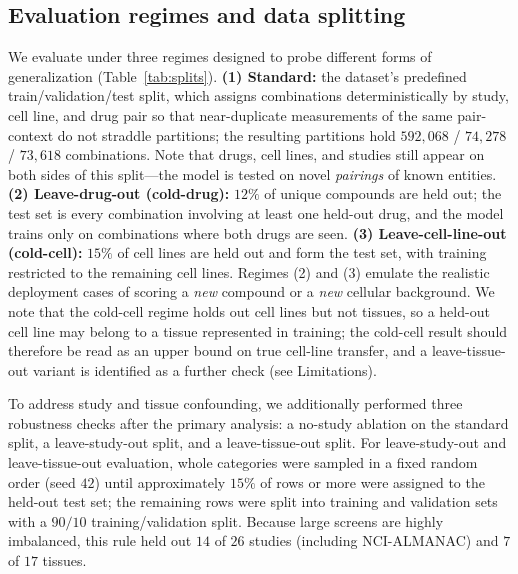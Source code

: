 \documentclass{bmcart}
\begin{document}
\subsection*{Evaluation regimes and data splitting}
We evaluate under three regimes designed to probe different forms of generalization
(Table~\ref{tab:splits}). \textbf{(1) Standard:} the dataset's predefined train/validation/test split,
which assigns combinations deterministically by study, cell line, and drug pair so that near-duplicate
measurements of the same pair-context do not straddle partitions; the resulting partitions hold
$592{,}068$ / $74{,}278$ / $73{,}618$ combinations. Note that drugs, cell lines, and studies still
appear on both sides of this split---the model is tested on novel \emph{pairings} of known entities.
\textbf{(2) Leave-drug-out (cold-drug):} $12\%$ of unique compounds are held out; the test set is every
combination involving at least one held-out drug, and the model trains only on combinations where both
drugs are seen. \textbf{(3) Leave-cell-line-out (cold-cell):} $15\%$ of cell lines are held out and form
the test set, with training restricted to the remaining cell lines. Regimes (2) and (3) emulate the
realistic deployment cases of scoring a \emph{new} compound or a \emph{new} cellular background. We
note that the cold-cell regime holds out cell lines but not tissues, so a held-out cell line may belong
to a tissue represented in training; the cold-cell result should therefore be read as an upper bound on
true cell-line transfer, and a leave-tissue-out variant is identified as a further check (see
Limitations).

To address study and tissue confounding, we additionally performed three robustness checks after the
primary analysis: a no-study ablation on the standard split, a leave-study-out split, and a
leave-tissue-out split. For leave-study-out and leave-tissue-out evaluation, whole categories were
sampled in a fixed random order (seed $42$) until approximately $15\%$ of rows or more were assigned to
the held-out test set; the remaining rows were split into training and validation sets with a $90/10$
training/validation split. Because large screens are highly imbalanced, this rule held out $14$ of
$26$ studies (including NCI-ALMANAC) and $7$ of $17$ tissues.
\end{document}
